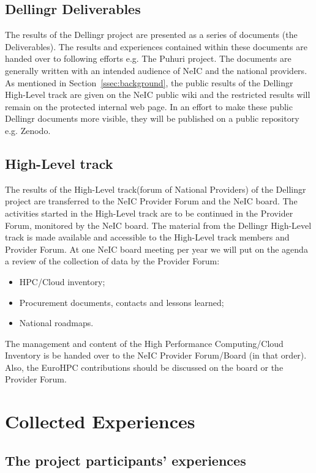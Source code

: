 \documentclass{article}
\newcommand{\dell}{Dellingr\xspace}
\newcommand{\np}{national provider\xspace}
\newcommand{\nps}{\np{s}\xspace}
\newcommand{\HLT}{High-Level track\xspace}
\begin{document}
\subsection{\dell Deliverables}
\label{ssec:deliverables}

The results of the \dell project are presented as a series of documents (the Deliverables).
The results and experiences contained within these documents are handed over to following efforts e.g. The Puhuri project.
The documents are generally written with an intended audience of NeIC and the \nps.
As mentioned in Section~\ref{ssec:background}, the public results of the \dell \HLT are given on the NeIC public wiki
and the restricted results will remain on the protected internal web page.
In an effort to make these public \dell documents more visible, they will be published on a public repository e.g. Zenodo.

\subsection{\HLT}
\label{ssec:hlt}

The results of the \HLT (forum of National Providers) of the \dell project are transferred to the NeIC Provider Forum and the NeIC board.
The activities started in the \HLT are to be continued in the Provider Forum, monitored by the NeIC board.
The material from the \dell \HLT is made available and accessible to the \HLT members and Provider Forum.
At one NeIC board meeting per year we will put on the agenda a review of the collection of data by the Provider Forum:
\begin{itemize}
\item HPC/Cloud inventory;
\item Procurement documents, contacts and lessons learned;
\item National roadmaps.
\end{itemize}
The management and content of the High Performance Computing/Cloud Inventory is be handed over to the NeIC Provider Forum/Board (in that order). Also, the EuroHPC contributions should be discussed on the board or the Provider Forum.

    
\section{Collected Experiences}

\subsection{The project participants’ experiences}
\end{document}

